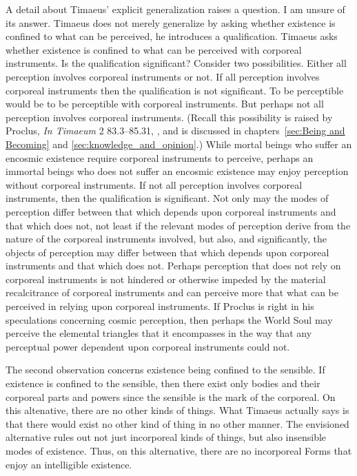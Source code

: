 A detail about Timaeus' explicit generalization raises a question. I am unsure of its answer. Timaeus does not merely generalize by asking whether existence is confined to what can be perceived, he introduces a qualification. Timaeus asks whether existence is confined to what can be perceived with corporeal instruments. Is the qualification significant? Consider two possibilities. Either all perception involves corporeal instruments or not. If all perception involves corporeal instruments then the qualification is not significant. To be perceptible would be to be perceptible with corporeal instruments. But perhaps not all perception involves corporeal instruments. (Recall this possibility is raised by Proclus, \emph{In Timaeum} 2 83.3–85.31, \citealt{Diehl:1903re}, and is discussed in chapters~\ref{sec:Being and Becoming} and \ref{sec:knowledge_and_opinion}.) While mortal beings who suffer an encosmic existence require corporeal instruments to perceive, perhaps an immortal beings who does not suffer an encosmic existence may enjoy perception without corporeal instruments. If not all perception involves corporeal instruments, then the qualification is significant. Not only may the modes of perception differ between that which depends upon corporeal instruments and that which does not, not least if the relevant modes of perception derive from the nature of the corporeal instruments involved, but also, and significantly, the objects of perception may differ between that which depends upon corporeal instruments and that which does not. Perhaps perception that does not rely on corporeal instruments is not hindered or otherwise impeded by the material recalcitrance of corporeal instruments and can perceive more that what can be perceived in relying upon corporeal instruments. If Proclus is right in his speculations concerning cosmic perception, then perhaps the World Soul may perceive the elemental triangles that it encompasses in the way that any perceptual power dependent upon corporeal instruments could not.

The second observation concerns existence being confined to the sensible. If existence is confined to the sensible, then there exist only bodies and their corporeal parts and powers since the sensible is the mark of the corporeal. On this altenative, there are no other kinds of things. What Timaeus actually says is that there would exist no other kind of thing in no other manner. The envisioned alternative rules out not just incorporeal kinds of things, but also insensible modes of existence. Thus, on this alternative, there are no incorporeal Forms that enjoy an intelligible existence.

